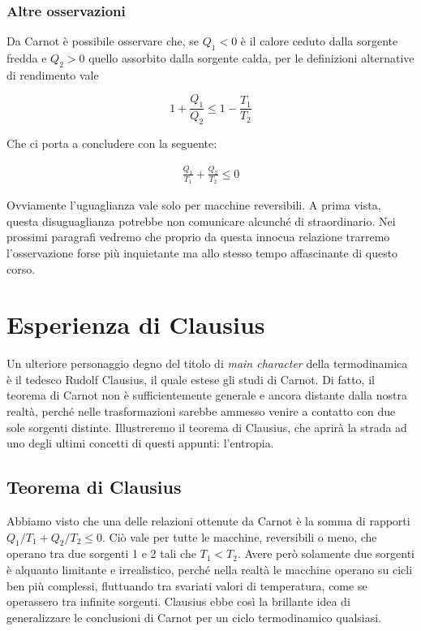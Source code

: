 \subsubsection*{Altre osservazioni}
Da Carnot è possibile osservare che, se $Q_1 < 0$ è il calore ceduto
dalla sorgente fredda e $Q_2 > 0$ quello assorbito dalla sorgente
calda, per le definizioni alternative di rendimento vale

\[ 1 + \frac{Q_1}{Q_2} \leq 1 - \frac{T_1}{T_2} \]

\noindent Che ci porta a concludere con la seguente:

\begin{align}
    \frac{Q_1}{T_1} + \frac{Q_2}{T_2} \leq 0
\end{align}

Ovviamente l'uguaglianza vale solo per macchine reversibili.
A prima vista, questa disuguaglianza potrebbe non comunicare
alcunché di straordinario. Nei prossimi paragrafi vedremo che
proprio da questa innocua relazione trarremo l'osservazione
forse più inquietante ma allo stesso tempo affascinante di
questo corso.

\section{Esperienza di Clausius}
Un ulteriore personaggio degno del titolo di \textit{main character}
della termodinamica è il tedesco Rudolf Clausius, il quale estese
gli studi di Carnot. Di fatto, il teorema di Carnot non è sufficientemente
generale e ancora distante dalla nostra realtà, perché nelle trasformazioni
sarebbe ammesso venire a contatto con due sole sorgenti distinte. Illustreremo il teorema di Clausius, che
aprirà la strada ad uno degli ultimi concetti di questi appunti:
l'entropia.

\subsection{Teorema di Clausius}
Abbiamo visto che una delle relazioni ottenute da Carnot è la
somma di rapporti $Q_1/T_1 + Q_2/T_2 \leq 0$. Ciò vale per tutte
le macchine, reversibili o meno, che operano tra due sorgenti 1
e 2 tali che $T_1 < T_2$. Avere però solamente due sorgenti è
alquanto limitante e irrealistico, perché nella realtà le macchine
operano su cicli ben più complessi, fluttuando tra svariati valori
di temperatura, come se operassero tra infinite sorgenti. Clausius
ebbe così la brillante idea di generalizzare le conclusioni di
Carnot per un ciclo termodinamico qualsiasi.

